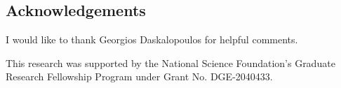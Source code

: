 \documentclass[reqno,11pt]{amsart}
\newcommand{\RR}{\mathbf{R}}
\newcommand{\Ball}{\mathbf{B}}
\newcommand*\dif{\mathop{}\!\mathrm{d}}
\DeclareMathOperator{\tr}{tr}
\DeclareMathOperator*{\esssup}{ess\,sup}
\newcommand{\Comass}{\mathbf L}
\newcommand{\dfn}[1]{\emph{#1}\index{#1}}
\theoremstyle{definition}
\numberwithin{equation}{section}
\newcommand\todo[1]{\textcolor{red}{TODO: #1}}
\begin{document}
\subsection{Acknowledgements}
I would like to thank Georgios Daskalopoulos for helpful comments.

This research was supported by the National Science Foundation's Graduate Research Fellowship Program under Grant No. DGE-2040433.




\end{document}
